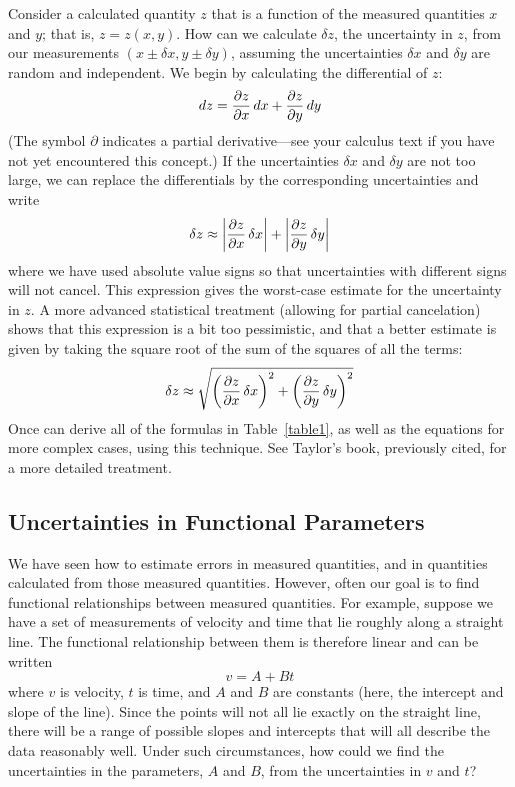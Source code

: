      Consider a calculated quantity $z$ that is a function of the
measured quantities $x$ and $y$; that is, $z = z(x,y)$.  How can we
calculate $\delta z$, the uncertainty in $z$, from our measurements
$(x \pm \delta x, y \pm \delta y)$,
assuming the uncertainties $\delta x$ and $\delta y$ are random and
independent.  We begin by calculating the differential of $z$:
\[
dz = {{\partial z} \over {\partial x}} \, dx +
            {{\partial z} \over {\partial y}} \, dy
\]
(The symbol $\partial$ indicates a partial derivative---see your
calculus text if you have not yet encountered this concept.) If
the uncertainties $\delta x$ and $\delta y$ are not too large, we can
replace the differentials by the corresponding uncertainties and
write
\[
\delta z \approx \left|{{\partial z} \over {\partial x}} \, \delta x \right| +
            \left| {{\partial z} \over {\partial y}} \, \delta y \right|
\]
where we have used absolute value signs so that
uncertainties with different signs will not cancel.  This
expression gives the worst-case estimate for the uncertainty
in $z$.  A more advanced statistical treatment (allowing for partial cancelation) shows
that this expression is a bit too pessimistic, and that a better
estimate is given by taking the square root of the sum of the
squares of all the terms:
\[
\delta z \approx \sqrt{ \left({{\partial z} \over {\partial x}} \, \delta x
                 \right)^{2} + \left( {{\partial z} \over {\partial y}} \,
                 \delta y \right)^{2} }
\]
Once can derive all of the formulas in Table~\ref{table1}, as well as
the equations for more complex cases, using this technique.  See
Taylor's book, previously cited, for a more detailed treatment.

\subsection*{Uncertainties in Functional Parameters}
     We have seen how to estimate errors in measured quantities,
and in quantities calculated from those measured quantities.
However, often our goal is to find functional
relationships between measured quantities.  For example, suppose we
have a set of measurements of velocity and time that lie roughly along
a straight line.  The functional relationship between them is
therefore linear and can be written
\[
v = A + Bt
\]
where $v$ is velocity, $t$ is time, and $A$ and $B$ are constants
(here, the intercept and slope of the line).  Since the points will
not all lie exactly on the straight line, there will be a range of
possible slopes and intercepts that will all describe the data
reasonably well.  Under such circumstances, how
could we find the uncertainties in the parameters, $A$ and $B$, from
the uncertainties in $v$ and $t$?

